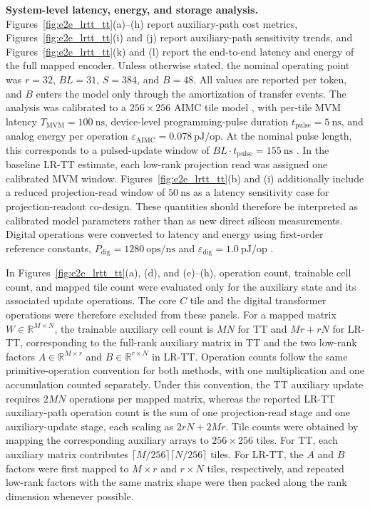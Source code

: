 \documentclass[AMA,LATO2COL]{WileyNJDv5}
\begin{document}
\noindent\textbf{System-level latency, energy, and storage analysis.}
Figures~\ref{fig:e2e_lrtt_tt}(a)--(h) report auxiliary-path cost metrics, Figures~\ref{fig:e2e_lrtt_tt}(i) and (j) report auxiliary-path sensitivity trends, and Figures~\ref{fig:e2e_lrtt_tt}(k) and (l) report the end-to-end latency and energy of the full mapped encoder. Unless otherwise stated, the nominal operating point was \(r=32\), \(BL=31\), \(S=384\), and \(B=48\). All values are reported per token, and \(B\) enters the model only through the amortization of transfer events. The analysis was calibrated to a \(256\times256\) AIMC tile model \cite{klein2023alpine}, with per-tile MVM latency \(T_{\mathrm{MVM}}=100~\mathrm{ns}\), device-level programming-pulse duration \(t_{\mathrm{pulse}}=5~\mathrm{ns}\), and analog energy per operation \(\varepsilon_{\mathrm{AIMC}}=0.078~\mathrm{pJ/op}\). At the nominal pulse length, this corresponds to a pulsed-update window of \(BL\cdot t_{\mathrm{pulse}}=155~\mathrm{ns}\) \cite{rasch2024fastrobust}. In the baseline LR-TT estimate, each low-rank projection read was assigned one calibrated MVM window. Figures~\ref{fig:e2e_lrtt_tt}(b) and (i) additionally include a reduced projection-read window of \(50~\mathrm{ns}\) as a latency sensitivity case for projection-readout co-design. These quantities should therefore be interpreted as calibrated model parameters rather than as new direct silicon measurements. Digital operations were converted to latency and energy using first-order reference constants, \(P_{\mathrm{dig}}=1280~\mathrm{ops/ns}\) and \(\varepsilon_{\mathrm{dig}}=1.0~\mathrm{pJ/op}\) \cite{chen2025albertanalog,horowitz2014computing}.

\noindent
In Figures~\ref{fig:e2e_lrtt_tt}(a), (d), and (e)--(h), operation count, trainable cell count, and mapped tile count were evaluated only for the auxiliary state and its associated update operations. The core \(C\) tile and the digital transformer operations were therefore excluded from these panels. For a mapped matrix \(W\in\mathbb{R}^{M\times N}\), the trainable auxiliary cell count is \(MN\) for TT and \(Mr+rN\) for LR-TT, corresponding to the full-rank auxiliary matrix in TT and the two low-rank factors \(A\in\mathbb{R}^{M\times r}\) and \(B\in\mathbb{R}^{r\times N}\) in LR-TT. Operation counts follow the same primitive-operation convention for both methods, with one multiplication and one accumulation counted separately. Under this convention, the TT auxiliary update requires \(2MN\) operations per mapped matrix, whereas the reported LR-TT auxiliary-path operation count is the sum of one projection-read stage and one auxiliary-update stage, each scaling as \(2rN+2Mr\). Tile counts were obtained by mapping the corresponding auxiliary arrays to \(256\times256\) tiles. For TT, each auxiliary matrix contributes \(\lceil M/256\rceil\lceil N/256\rceil\) tiles. For LR-TT, the \(A\) and \(B\) factors were first mapped to \(M\times r\) and \(r\times N\) tiles, respectively, and repeated low-rank factors with the same matrix shape were then packed along the rank dimension whenever possible.
\end{document}
